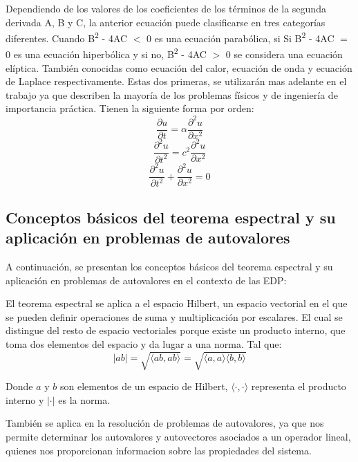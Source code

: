 \documentclass{article}
\begin{document}
        Dependiendo de los valores de los coeficientes de los términos de la segunda derivada A,
        B y C, la anterior ecuación puede clasificarse en tres categorías diferentes. Cuando B\textsuperscript{2} - 4AC $<$ 0 es una ecuación parabólica, si Si B\textsuperscript{2} - 4AC $=$ 0 es una ecuación hiperbólica y si no, B\textsuperscript{2} - 4AC $>$ 0 se considera una ecuación elíptica. También conocidas como ecuación del calor, ecuación de onda y ecuación de Laplace respectivamente. Estas dos primeras, se utilizarán mas adelante en el trabajo ya que describen la mayoría de los problemas físicos y de ingeniería de importancia práctica. Tienen la siguiente forma por orden:
        \begin{equation}
        \frac{\partial u}{\partial t} = \alpha \frac{\partial^2 u}{\partial x^2}
        \end{equation}
        \begin{equation}
        \frac{\partial^2 u}{\partial t^2} = c^2 \frac{\partial^2 u}{\partial x^2}
        \end{equation}
        \begin{equation}
            \frac{\partial^2 u}{\partial t^2} + \frac{\partial^2 u}{\partial x^2}= 0
        \end{equation}
    \subsection{Conceptos básicos del teorema espectral y su aplicación en problemas de autovalores}

    A continuación, se presentan los conceptos básicos del teorema espectral y su aplicación en problemas de autovalores en el contexto de las EDP:

    El teorema espectral se aplica a el espacio Hilbert, un espacio vectorial en el que se pueden definir operaciones de suma y multiplicación por escalares. El cual se distingue del resto de espacio vectoriales porque existe un producto interno, que toma dos elementos del espacio y da lugar a una norma. Tal que:
    \begin{equation}
        |ab| = \sqrt{\langle ab, ab \rangle} = \sqrt{\langle a,a \rangle \langle b,b \rangle}
        \end{equation}
        
        Donde $a$ y $b$ son elementos de un espacio de Hilbert, $\langle \cdot, \cdot \rangle$ representa el producto interno y $| \cdot |$ es la norma.
    
    
    También se aplica en la resolución de problemas de autovalores, ya que nos permite determinar los autovalores y autovectores asociados a un operador lineal, quienes nos proporcionan informacion sobre las propiedades del sistema.
\end{document}

